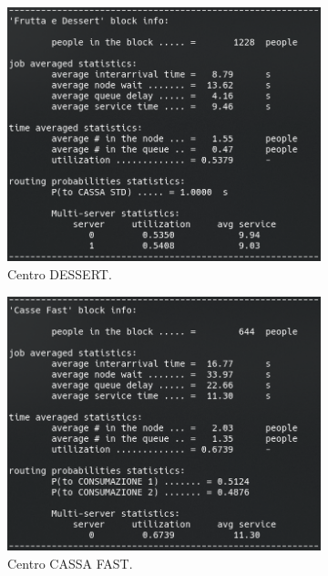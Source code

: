 \documentclass{article}
\begin{document}
\begin{figure}[H]
\begin{subfigure}{.5\textwidth}
\end{subfigure}
\begin{subfigure}{.5\textwidth}
  \centering
  \includegraphics[width=.9\linewidth]{img/migliorativo_2_1/dessert.png}
  \caption{Centro DESSERT.}
  \label{fig:dessert_ext_2_plo_1}
\end{subfigure}
\begin{subfigure}{.5\textwidth}
  \centering
  \includegraphics[width=.88\linewidth]{img/migliorativo_2_1/fast.png}
  \caption{Centro CASSA FAST.}
  \label{fig:cassa_fast_ext_2_pol_1}
\end{subfigure}
\begin{subfigure}{.5\textwidth}
  \centering

\end{subfigure}
\end{figure}
\end{document}
